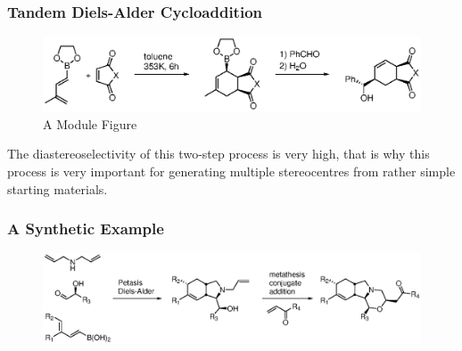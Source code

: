 \begin{frame}
	\frametitle{Tandem Diels-Alder Cycloaddition}
	\begin{figure}
		\centering
		\includegraphics[width=1.0\linewidth]{fig/tand-diels-module}
		\caption{A Module Figure}
		\label{fig:tand-diels-module}
	\end{figure}
	
	
	The diastereoselectivity of this two-step process is
	very high, that is why this process is very important for generating
	multiple stereocentres from rather simple starting materials.
	
\end{frame}

\begin{frame}
	\frametitle{A Synthetic Example}
	\begin{figure}
		\centering
		\includegraphics[width=1.0\linewidth]{fig/tand-diels-example}
		\caption{}
		\label{fig:tand-diels-example}
	\end{figure}
	
\end{frame}